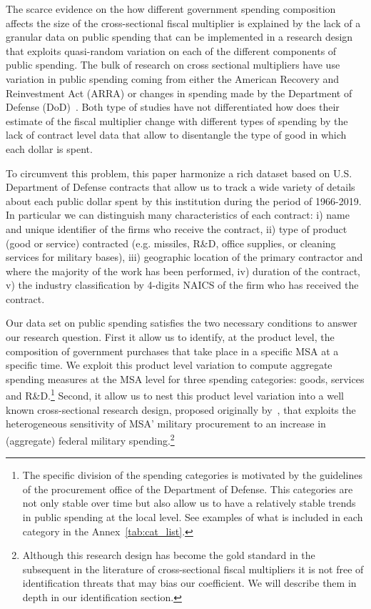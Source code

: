 \documentclass[dv_diss_main.tex]{subfiles}
\begin{document}
The scarce evidence on the how different government spending composition affects the size of the cross-sectional fiscal multiplier is explained by the lack of a granular data on public spending that can be implemented in a research design that exploits quasi-random variation on each of the different components of public spending. The bulk of research on cross sectional multipliers have use variation in public spending coming from either the American Recovery and Reinvestment Act (ARRA) \citep{chodorow2012does,wilson2012fiscal,conley2013american,dupor20162009} or changes in spending made by the Department of Defense (DoD)~\citep{Nakamura2014,dupor2017local,Demyanyk2019,Auerbach2020}. Both type of studies have not differentiated how does their estimate of the fiscal multiplier change with different types of spending by the lack of contract level data that allow to disentangle the type of good in which each dollar is spent.

To circumvent this problem, this paper harmonize a rich dataset based on U.S. Department of Defense contracts that allow us to track a wide variety of details about each public dollar spent by this institution during the period of 1966-2019. In particular we can distinguish many characteristics of each contract: i) name and unique identifier of the firms who receive the contract, ii) type of product (good or service) contracted (e.g. missiles, R\&D, office supplies, or cleaning services for military bases), iii) geographic location of the primary contractor and where the majority of the work has been performed, iv) duration of the contract, v) the industry classification by 4-digits NAICS of the firm who has received the contract. 

Our data set on public spending satisfies the two necessary conditions to answer our research question. First it allow us to identify, at the product level, the composition of government purchases that take place in a specific MSA at a specific time. We exploit this product level variation to compute aggregate spending measures at the MSA level for three spending categories: goods, services and R\&D.\footnote{The specific division of the spending categories is motivated by the guidelines of the procurement office of the Department of Defense. This categories are not only stable over time but also allow us to have a relatively stable trends in public spending at the local level. See examples of what is included in each category in the Annex~\ref{tab:cat_list}.} Second, it allow us to nest this product level variation into a well known cross-sectional research design, proposed originally by~\cite{Nakamura2014}, that exploits  the heterogeneous sensitivity of MSA’ military procurement to an increase in (aggregate) federal military spending.\footnote{Although this research design has become the gold standard in the subsequent in the literature of cross-sectional fiscal  multipliers \citep{Auerbach2019,Demyanyk2019,basso2021young,dupor2017local,Juarros2021} it is not free of identification threats that may bias our coefficient. We will describe them in depth in our identification section.}
\end{document}
